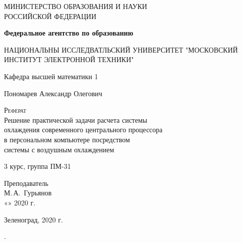 \documentclass[a4paper]{article}
\begin{document}
\begin{titlepage}
  \begin{center}
    \large
    МИНИСТЕРСТВО ОБРАЗОВАНИЯ И НАУКИ\\ РОССИЙСКОЙ ФЕДЕРАЦИИ
     
    \textbf{Федеральное агентство по образованию}
    \vspace{0.5cm}
 
    НАЦИОНАЛЬНЫ ИССЛЕДВАТЛЬСКИЙ УНИВЕРСИТЕТ "МОСКОВСКИЙ ИНСТИТУТ ЭЛЕКТРОННОЙ ТЕХНИКИ"
    \vspace{0.25cm}
     
    Кафедра высшей математики 1
    \vfill
    
    Пономарев Александр Олегович
    \vfill
 
    \textsc{Реферат}\\[5mm]
     
    {\LARGE Решение практической задачи расчета системы \\
    охлаждения современного центрального процессора \\
    в персональном компьютере посредством \\
    системы с воздушным охлаждением}
  \bigskip
  
  3 курс, группа ПМ-31
     
\end{center}
\vfill
 
\newlength{\ML}
\hfill\begin{minipage}{0.4\textwidth}
  Преподаватель\\
  \underline{\hspace{\ML}} М.\,А.~Гурьянов\\
  «\underline{\hspace{0.7cm}}» \underline{\hspace{2cm}} 2020 г.
\end{minipage}%
\bigskip
\vfill
 
\begin{center}
  Зеленоград, 2020 г.
\end{center}
\end{titlepage}


\tableofcontents.


\newpage
\end{document}
